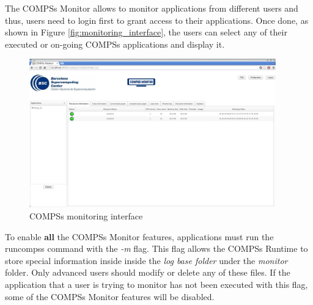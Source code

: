 The COMPSs Monitor allows to monitor applications from different users and thus, users need to login first to grant access 
to their applications. Once done, as shown in Figure \ref{fig:monitoring_interface}, the users can select any of their executed
or on-going COMPSs applications and display it.
\newpage
\begin{figure}[thb!]
  \centering
    \includegraphics[width=0.95\textwidth]{./Sections/4_Tools/Figures/compss_monitor.jpeg}
    \caption{COMPSs monitoring interface}
\end{figure}
\label{fig:monitoring_interface}

To enable \textbf{all} the COMPSs Monitor features, applications must run the runcompss command with the \textit{-m} flag. This flag 
allows the  COMPSs Runtime to store special information inside inside the \textit{log base folder} under the \textit{monitor} 
folder. Only advanced users should modify or delete any of these files. If the application that a user is trying to monitor 
has not been executed with this flag, some of the COMPSs Monitor features will be disabled. 

